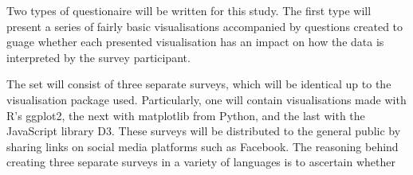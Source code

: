  

 
 






Two types of questionaire will be written for this study. The first type will present a series of fairly basic visualisations accompanied
by questions created to guage whether each presented visualisation has an impact on how the data is interpreted by the survey participant.


The set will consist of three separate surveys, which will be identical up to the visualisation package used. Particularly, one will contain 
visualisations made with R's ggplot2, the next with matplotlib from Python, and the last with the JavaScript library D3. These surveys will 
be distributed to the general public by sharing links on social media platforms such as Facebook. The reasoning behind creating three separate 
surveys in a variety of languages is to ascertain whether 






